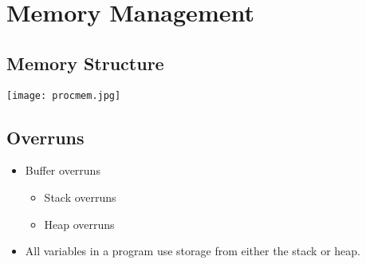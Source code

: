 \mode*




\section{Memory Management}

\subsection{Memory Structure}

\begin{frame}
  \texttt{[image: procmem.jpg]}
\end{frame}

\subsection{Overruns}

\begin{frame}
  \begin{itemize}
    \item Buffer overruns
      \begin{itemize}
        \item Stack overruns
        \item Heap overruns
      \end{itemize}

    \item All variables in a program use storage from either the stack or heap.
  \end{itemize}
\end{frame}

\begin{frame}[fragile]
  \inputminted{C}{login.c}
\end{frame}



%

